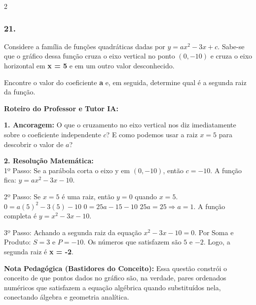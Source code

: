 \begin{multicols*}{2}
\subsubsection*{21.} 
\begin{enunciadoLiteral}
Considere a família de funções quadráticas dadas por $y = ax^2 - 3x + c$. Sabe-se que o gráfico dessa função cruza o eixo vertical no ponto $(0, -10)$ e cruza o eixo horizontal em \textbf{x = 5} e em um outro valor desconhecido.

Encontre o valor do coeficiente \textbf{a} e, em seguida, determine qual é a segunda raiz da função.
\end{enunciadoLiteral}

\ifgabarito
    \begin{tcolorbox}[colback=CorTitUm!5, colframe=CorTitUm, boxrule=1pt, arc=4pt, left=6pt, right=6pt, top=6pt, bottom=6pt]
    \small\textbf{\textcolor{CorTitUm}{Roteiro do Professor e Tutor IA:}}\par\vspace{0.1cm}
    \color{CinzaEscuro}
    \textbf{1. Ancoragem:} O que o cruzamento no eixo vertical nos diz imediatamente sobre o coeficiente independente $c$? E como podemos usar a raiz $x = 5$ para descobrir o valor de $a$?\par\vspace{0.1cm}
    \textbf{2. Resolução Matemática:}\\
    1º Passo: Se a parábola corta o eixo y em $(0, -10)$, então $c = -10$.
    A função fica: $y = ax^2 - 3x - 10$.
    
    2º Passo: Se $x = 5$ é uma raiz, então $y = 0$ quando $x = 5$.
    $0 = a(5)^2 - 3(5) - 10$
    $0 = 25a - 15 - 10$
    $25a = 25 \Rightarrow a = 1$.
    A função completa é $y = x^2 - 3x - 10$.
    
    3º Passo: Achando a segunda raiz da equação $x^2 - 3x - 10 = 0$.
    Por Soma e Produto: $S = 3$ e $P = -10$.
    Os números que satisfazem são $5$ e $-2$. Logo, a segunda raiz é \textbf{x = -2}.
    \end{tcolorbox}
    \vspace{0.15cm}
    
    \begin{boxexplicacao}
    \textbf{Nota Pedagógica (Bastidores do Conceito):} Essa questão constrói o conceito de que pontos dados no gráfico são, na verdade, pares ordenados numéricos que satisfazem a equação algébrica quando substituídos nela, conectando álgebra e geometria analítica.
    \end{boxexplicacao}
\fi


\end{multicols*}
